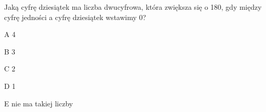 \begin{tresc}
Jaką cyfrę dziesiątek ma liczba dwucyfrowa, która zwiększa się o 180, gdy między cyfrę jedności a cyfrę dziesiątek wstawimy 0?
\end{tresc}
\begin{wariant}{A} 4 \end{wariant}
\begin{wariant}{B} 3 \end{wariant}
\begin{wariant}{C} 2 \end{wariant}
\begin{wariant}{D} 1 \end{wariant}
\begin{wariant}{E} nie ma takiej liczby \end{wariant}
